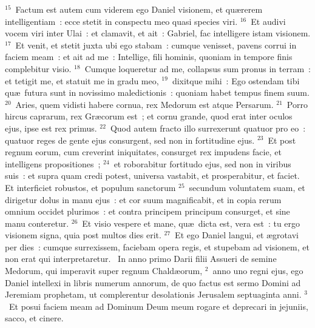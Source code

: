 ${}^{15}$~Factum est autem cum viderem ego Daniel visionem, et qu\ae rerem intelligentiam~: ecce stetit in conspectu meo quasi species viri.
${}^{16}$~Et audivi vocem viri inter Ulai~: et clamavit, et ait~: Gabriel, fac intelligere istam visionem.
${}^{17}$~Et venit, et stetit juxta ubi ego stabam~: cumque venisset, pavens corrui in faciem meam~: et ait ad me~: Intellige, fili hominis, quoniam in tempore finis complebitur visio.
${}^{18}$~Cumque loqueretur ad me, collapsus sum pronus in terram~: et tetigit me, et statuit me in gradu meo,
${}^{19}$~dixitque mihi~: Ego ostendam tibi qu\ae\ futura sunt in novissimo maledictionis~: quoniam habet tempus finem suum.
${}^{20}$~Aries, quem vidisti habere cornua, rex Medorum est atque Persarum.
${}^{21}$~Porro hircus caprarum, rex Gr\ae corum est~; et cornu grande, quod erat inter oculos ejus, ipse est rex primus.
${}^{22}$~Quod autem fracto illo surrexerunt quatuor pro eo~: quatuor reges de gente ejus consurgent, sed non in fortitudine ejus.
${}^{23}$~Et post regnum eorum, cum creverint iniquitates, consurget rex impudens facie, et intelligens propositiones~;
${}^{24}$~et roborabitur fortitudo ejus, sed non in viribus suis~: et supra quam credi potest, universa vastabit, et prosperabitur, et faciet. Et interficiet robustos, et populum sanctorum
${}^{25}$~secundum voluntatem suam, et dirigetur dolus in manu ejus~: et cor suum magnificabit, et in copia rerum omnium occidet plurimos~: et contra principem principum consurget, et sine manu conteretur.
${}^{26}$~Et visio vespere et mane, qu\ae\ dicta est, vera est~: tu ergo visionem signa, quia post multos dies erit.
${}^{27}$~Et ego Daniel langui, et \ae grotavi per dies~: cumque surrexissem, faciebam opera regis, et stupebam ad visionem, et non erat qui interpretaretur.
~In anno primo Darii filii Assueri de semine Medorum, qui imperavit super regnum Chald\ae orum,
${}^{2}$~anno uno regni ejus, ego Daniel intellexi in libris numerum annorum, de quo factus est sermo Domini ad Jeremiam prophetam, ut complerentur desolationis Jerusalem septuaginta anni.
${}^{3}$~Et posui faciem meam ad Dominum Deum meum rogare et deprecari in jejuniis, sacco, et cinere.


